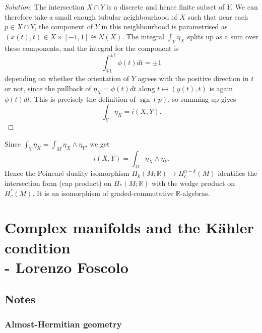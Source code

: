 \documentclass[a4paper]{article}
\theoremstyle{definition}
\theoremstyle{remark}
\DeclareMathOperator{\sgn}{sgn}
\newcommand{\R}{\mathbb{R}}
\begin{document}
\begin{proof}[Solution]
    The intersection $X\cap Y$ is a discrete and hence finite subset of $Y$.
    We can therefore take a small enough tubular neighbourhood of $X$ such that
    near each $p\in X\cap Y$, the component of $Y$ in this neighbourhood is parametrised as
    $(x(t),t)\in X\times[-1,1]\cong N(X)$. The integral $\int_Y\eta_X$ splits
    up as a sum over these components, and the integral for the component is
    \begin{equation*}
        \int_{\mp1}^{\pm1}\phi(t)dt = \pm1
    \end{equation*}
    depending on whether the orientation of $Y$ agrees with the positive
    direction in $t$ or not, since the pullback of $\eta_X=\phi(t)dt$ along
    $t\mapsto(y(t),t)$ is again $\phi(t)dt$. This is precisely the definition
    of $\sgn(p)$, so summing up gives
    \begin{equation*}
        \int_Y\eta_X = i(X,Y).
    \end{equation*}
\end{proof}

Since $\int_Y\eta_X=\int_M\eta_X\wedge\eta_Y$, we get
\begin{equation*}
    i(X,Y) = \int_M\eta_X\wedge\eta_Y.
\end{equation*}
Hence the Poincar\'e duality isomorphism $H_k(M;\R)\to H^{n-k}_c(M)$ identifies
the intersection form (cap product) on $H_*(M;\R)$ with the wedge product on
$H^*_c(M)$. It is an isomorphism of graded-commutative $\R$-algebras.

\section{Complex manifolds and the K\"ahler condition \\ - Lorenzo Foscolo}

\subsection*{Notes}

\subsubsection*{Almost-Hermitian geometry}
\end{document}
